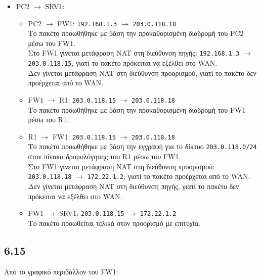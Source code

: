 \documentclass[a4paper, 12pt]{article}
\begin{document}
		\begin{itemize}
			\item PC2 $\rightarrow$ SRV1:
				\begin{itemize}
					\item PC2 $\rightarrow$ FW1: \verb|192.168.1.3| $\rightarrow$ \verb|203.0.118.18| \\
					Το πακέτο προωθήθηκε με βάση την προκαθορισμένη διαδρομή του PC2 μέσω του FW1. \\
					
					Στο FW1 γίνεται μετάφραση NAT στη διεύθυνση πηγής: \verb|192.168.1.3| $\rightarrow$ \verb|203.0.118.15|, γιατί το πακέτο πρόκειται να εξέλθει στο WAN. \\
					
					Δεν γίνεται μετάφραση NAT στη διεύθυνση προορισμού, γιατί το πακέτο δεν προέρχεται από το WAN. \\
									
					\item FW1 $\rightarrow$ R1: \verb|203.0.118.15| $\rightarrow$ \verb|203.0.118.18| \\
					Το πακέτο προωθήθηκε με βάση την προκαθορισμένη διαδρομή του FW1 μέσω του R1. \\
					
					\item R1 $\rightarrow$ FW1: \verb|203.0.118.15| $\rightarrow$ \verb|203.0.118.18| \\
					Το πακέτο προωθήθηκε με βάση την εγγραφή για το δίκτυο \verb|203.0.118.0/24| στον πίνακα δρομολόγησης του R1 μέσω του FW1. \\
					
					Στο FW1 γίνεται μετάφραση NAT στη διεύθυνση προορισμού: \verb|203.0.118.18| $\rightarrow$ \verb|172.22.1.2|, γιατί το πακέτο προέρχεται από το WAN. \\
					
					Δεν γίνεται μετάφραση NAT στη διεύθυνση πηγής, γιατί το πακέτο δεν πρόκειται να εξέλθει στο WAN. \\
					
					\item FW1 $\rightarrow$ SRV1: \verb|203.0.118.15| $\rightarrow$ \verb|172.22.1.2| \\
					Το πακέτο προωθείται τελικά στον προορισμό με επιτυχία.
				\end{itemize}
		\end{itemize}
		
	\subsection*{6.15}
		Από το γραφικό περιβάλλον του FW1:
		
\end{document}
